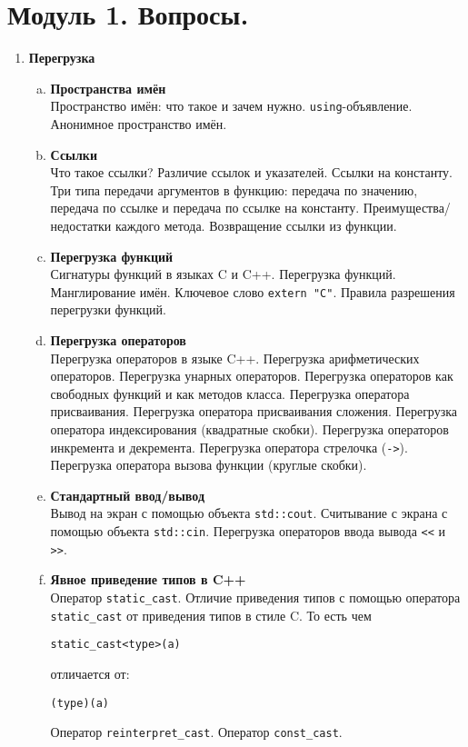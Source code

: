 \documentclass{article}
\begin{document}

\section*{Модуль 1. Вопросы.}
\begin{enumerate}
\item \textbf{Перегрузка}

\begin{enumerate}[a.]
\item \textbf{Пространства имён}\\
Пространство имён: что такое и зачем нужно. \texttt{using}-объявление. Анонимное пространство имён. 

\item \textbf{Ссылки}\\
Что такое ссылки? Различие ссылок и указателей. Ссылки на константу. Три типа передачи аргументов в функцию: передача по значению, передача по ссылке и передача по ссылке на константу. Преимущества/недостатки каждого метода. Возвращение ссылки из функции.

\item  \textbf{Перегрузка функций}\\
Сигнатуры функций в языках C и C++. Перегрузка функций. Манглирование имён. Ключевое слово \texttt{extern "C"}. Правила разрешения перегрузки функций. 

\item \textbf{Перегрузка операторов}\\
Перегрузка операторов в языке C++. Перегрузка арифметических операторов. Перегрузка унарных операторов. Перегрузка операторов как свободных функций и как методов класса. Перегрузка оператора присваивания. Перегрузка оператора присваивания сложения.  Перегрузка оператора индексирования (квадратные скобки). Перегрузка операторов инкремента и декремента. Перегрузка оператора стрелочка (\texttt{->}). Перегрузка оператора вызова функции (круглые скобки).

\item \textbf{Стандартный ввод/вывод}\\
Вывод на экран с помощью объекта \texttt{std::cout}. Считывание с экрана с помощью объекта \texttt{std::cin}. Перегрузка операторов ввода вывода \verb|<<| и \verb|>>|.

\item \textbf{Явное приведение типов в C++}\\
Оператор \texttt{static\_cast}. Отличие приведения типов с помощью оператора \texttt{static\_cast} от приведения типов в стиле C. То есть чем
\begin{lstlisting}
static_cast<type>(a)
\end{lstlisting}
отличается от:
\begin{lstlisting}
(type)(a)
\end{lstlisting}
Оператор \texttt{reinterpret\_cast}. 
Оператор \texttt{const\_cast}.
\end{enumerate}




\end{enumerate}
\end{document}
